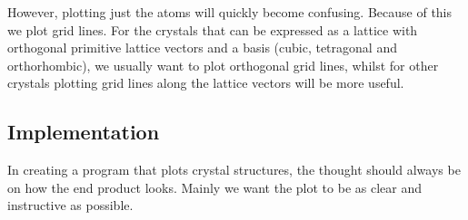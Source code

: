\documentclass[a4paper,10pt]{article}
\numberwithin{equation}{section}
\begin{document}
	However, plotting just the atoms will quickly become confusing. Because of this we plot grid lines. For the crystals that can be expressed as a lattice with orthogonal primitive lattice vectors and a basis (cubic, tetragonal and orthorhombic), we usually want to plot orthogonal grid lines, whilst for other crystals plotting grid lines along the lattice vectors will be more useful.
	
	
	\subsection{Implementation}
	In creating a program that plots crystal structures, the thought should always be on how the end product looks. Mainly we want the plot to be as clear and instructive as possible.
		
	
\end{document}
